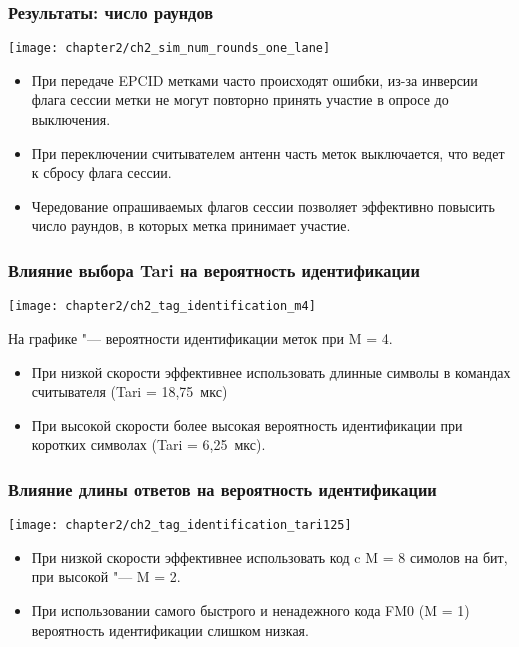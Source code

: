 \begin{frame}
    \frametitle{Результаты: число раундов}
    \begin{center}
        \texttt{[image: chapter2/ch2\_sim\_num\_rounds\_one\_lane]}
    \end{center}
    \begin{itemize}
    \item При передаче EPCID метками часто происходят ошибки, из-за инверсии флага сессии метки не могут повторно принять участие в опросе до выключения.
    \item При переключении считывателем антенн часть меток выключается, что ведет к сбросу флага сессии.
    \item Чередование опрашиваемых флагов сессии позволяет эффективно повысить число раундов, в которых метка принимает участие.
    \end{itemize}
\end{frame}

\begin{frame}
    \frametitle{Влияние выбора Tari на вероятность идентификации}
    \begin{center}
        \texttt{[image: chapter2/ch2\_tag\_identification\_m4]}
    \end{center}
    На графике "--- вероятности идентификации меток при M = 4.
    \begin{itemize}
    \item При низкой скорости эффективнее использовать длинные символы в командах считывателя (Tari = 18,75~мкс)
    \item При высокой скорости более высокая вероятность идентификации при коротких символах (Tari = 6,25~мкс).
    \end{itemize}
\end{frame}

\begin{frame}
    \frametitle{Влияние длины ответов на вероятность идентификации}
    \begin{center}
        \texttt{[image: chapter2/ch2\_tag\_identification\_tari125]}
    \end{center}
    \begin{itemize}
        \item При низкой скорости эффективнее использовать код c M = 8 симолов на бит, при высокой "--- M = 2.
        \item При использовании самого быстрого и ненадежного кода FM0 (M = 1) вероятность идентификации слишком низкая.
    \end{itemize}
\end{frame}

